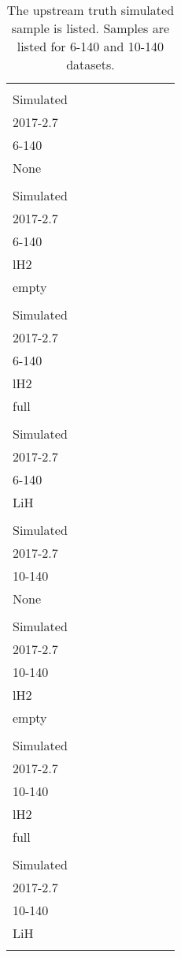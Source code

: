 \begin{landscape}
\begin{table}
\centering
\caption{The upstream truth simulated sample is listed.  Samples are listed for 6-140 and 10-140 datasets.\label{tab:mc_cuts_summary_3_1}}
\begin{tabular}[pos]{l|cccccccc}
                                                   & \splitcell{\\Simulated\\2017-2.7\\6-140\\None\\} & \splitcell{\\Simulated\\2017-2.7\\6-140\\lH2\\empty\\} & \splitcell{\\Simulated\\2017-2.7\\6-140\\lH2\\full\\} & \splitcell{\\Simulated\\2017-2.7\\6-140\\LiH\\} & \splitcell{\\Simulated\\2017-2.7\\10-140\\None\\} & \splitcell{\\Simulated\\2017-2.7\\10-140\\lH2\\empty\\} & \splitcell{\\Simulated\\2017-2.7\\10-140\\lH2\\full\\} & \splitcell{\\Simulated\\2017-2.7\\10-140\\LiH\\} \\

\end{tabular}
\end{table}
\end{landscape}
